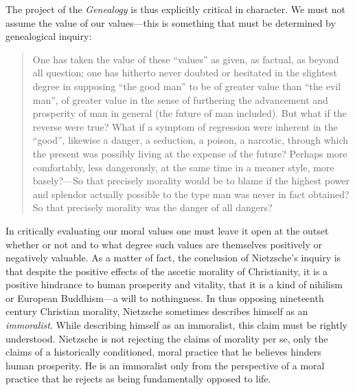 The project of the \emph{Genealogy} is thus explicitly critical in character. We must not assume the value of our values---this is something that must be determined by genealogical inquiry:
\begin{quote}
    One has taken the value of these ``values'' as given, as factual, as beyond all question; one has hitherto never doubted or hesitated in the slightest degree in supposing ``the good man'' to be of greater value than ``the evil man'', of greater value in the sense of furthering the advancement and prosperity of man in general (the future of man included). But what if the reverse were true? What if a symptom of regression were inherent in the ``good'', likewise a danger, a seduction, a poison, a narcotic, through which the present was possibly living at the expense of the future? Perhaps more comfortably, less dangerously, at the same time in a meaner style, more basely?---So that  precisely morality would be to blame if the highest power and splendor actually possible to the type man was never in fact obtained? So that precisely morality was the danger of all dangers?
\end{quote}
In critically evaluating our moral values one must leave it open at the outset whether or not and to what degree such values are themselves positively or negatively valuable. As a matter of fact, the conclusion of Nietzsche's inquiry is that despite the positive effects of the ascetic morality of Christianity, it is a positive hindrance to human prosperity and vitality, that it is a kind of nihilism or European Buddhism---a will to nothingness. In thus opposing nineteenth century Christian morality, Nietzsche sometimes describes himself as an \emph{immoralist}. While describing himself as an immoralist, this claim must be rightly understood. Nietzsche is not rejecting the claims of morality per se, only the claims of a historically conditioned, moral practice that he believes hinders human prosperity. He is an immoralist only from the perspective of a moral practice that he rejects as being fundamentally opposed to life. \change

